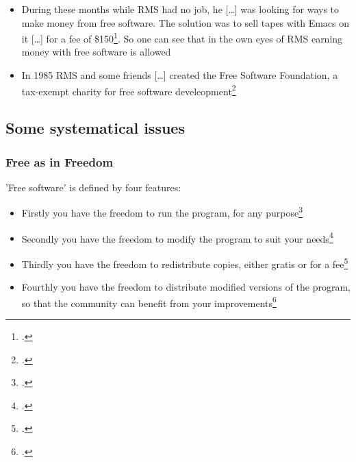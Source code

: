 \documentclass[DIV=calc,BCOR=5mm,11pt,headings=small,oneside,abstract=true, toc=bib]{scrartcl}
\begin{document}
\begin{itemize}
  project: he \glqq{}[\ldots] quit (his) job at MIT and began writing GNU
  software\grqq{}\footcite[cf][18]{Stallman1999a}. To give up the job was
  essential for RMS because he did not want to allow the MIT to cover his
  work\footcite[cf][18]{Stallman1999a}. But nevertheless he was supported by the
  MIT: they \glqq{}[\ldots] kindly invited (him) to keep using the lab’s
  facilities\grqq{}\footcite[cf][19]{Stallman1999a}:
  \begin{itemize}
    \item Firstly RMS evaluated wether he could reuse any existing compiler.
    Later on he had to write hiw own compiler, the
    GCC\footcite[cf][19]{Stallman1999a}
    \item From Sepmtember 1984 on he wrote the GNU emacs
    editor\footcite[cf][19]{Stallman1999a}
  \end{itemize}
  \item During these months while RMS had no job, he \glqq{}[\ldots] was looking
  for ways to make money from free software\grqq{}. The solution was to sell
  tapes with Emacs on it \glqq{}[\ldots] for a fee of
  \$150\grqq{}\footcite[cf][19f]{Stallman1999a}. So one can see that in the own
  eyes of RMS earning money with free software is allowed
  \item In 1985 RMS and some friends \glqq{}[\ldots] created the Free Software
  Foundation, a tax-exempt charity for free software
  develeopment\grqq{}\footcite[cf][21]{Stallman1999a}
\end{itemize}


\subsection{Some systematical issues}
\subsubsection{\glqq{}Free as in Freedom\grqq{}}
’Free software’ is defined by four features:
\begin{itemize}
  \item Firstly \glqq{} you have the freedom to run the program, for any
  purpose\grqq{}\footcite[cf][18]{Stallman1999a}
  \item Secondly \glqq{}you have the freedom to modify the program to suit your
  needs\grqq{}\footcite[cf][18]{Stallman1999a}
  \item Thirdly \glqq{}you have the freedom to redistribute copies, either
  gratis or for a fee\grqq{}\footcite[cf][18]{Stallman1999a}
  \item Fourthly \glqq{}you have the freedom to distribute modified versions of
  the program, so that the community can benefit from your
  improvements\grqq{}\footcite[cf][18]{Stallman1999a}
\end{itemize}
\end{document}
